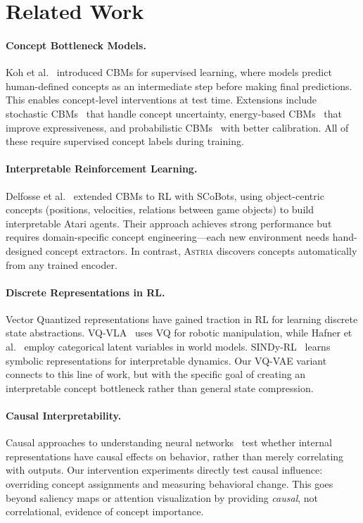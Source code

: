 \documentclass[11pt,a4paper]{article}
\newcommand{\astria}{\textsc{Astria}}
\begin{document}
\section{Related Work}

\paragraph{Concept Bottleneck Models.}
Koh et al.~\citep{koh2020concept} introduced CBMs for supervised learning, where models predict human-defined concepts as an intermediate step before making final predictions. This enables concept-level interventions at test time. Extensions include stochastic CBMs~\citep{kim2023stochastic} that handle concept uncertainty, energy-based CBMs~\citep{xu2024energy} that improve expressiveness, and probabilistic CBMs~\citep{kim2023probabilistic} with better calibration. All of these require supervised concept labels during training.

\paragraph{Interpretable Reinforcement Learning.}
Delfosse et al.~\citep{delfosse2024interpretable} extended CBMs to RL with SCoBots, using object-centric concepts (positions, velocities, relations between game objects) to build interpretable Atari agents. Their approach achieves strong performance but requires domain-specific concept engineering---each new environment needs hand-designed concept extractors. In contrast, \astria{} discovers concepts automatically from any trained encoder.

\paragraph{Discrete Representations in RL.}
Vector Quantized representations have gained traction in RL for learning discrete state abstractions. VQ-VLA~\citep{zhu2024vqvla} uses VQ for robotic manipulation, while Hafner et al.~\citep{hafner2020dreamer} employ categorical latent variables in world models. SINDy-RL~\citep{zolman2025sindyrl} learns symbolic representations for interpretable dynamics. Our VQ-VAE variant connects to this line of work, but with the specific goal of creating an interpretable concept bottleneck rather than general state compression.

\paragraph{Causal Interpretability.}
Causal approaches to understanding neural networks~\citep{geiger2021causal} test whether internal representations have causal effects on behavior, rather than merely correlating with outputs. Our intervention experiments directly test causal influence: overriding concept assignments and measuring behavioral change. This goes beyond saliency maps or attention visualization by providing \emph{causal}, not correlational, evidence of concept importance.
\end{document}
